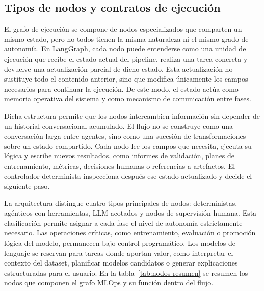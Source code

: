 \documentclass[12pt,a4paper]{article}
\theoremstyle{plain}
\begin{document}
\subsection{Tipos de nodos y contratos de ejecución}
\label{sec:tipos-nodos}

El grafo de ejecución se compone de nodos especializados que comparten un mismo estado, pero no todos tienen la misma naturaleza ni el mismo grado de autonomía. En LangGraph, cada nodo puede entenderse como una unidad de ejecución que recibe el estado actual del pipeline, realiza una tarea concreta y devuelve una actualización parcial de dicho estado. Esta actualización no sustituye todo el contenido anterior, sino que modifica únicamente los campos necesarios para continuar la ejecución. De este modo, el estado actúa como memoria operativa del sistema y como mecanismo de comunicación entre fases.

Dicha estructura permite que los nodos intercambien información sin depender de un historial conversacional acumulado. El flujo no se construye como una conversación larga entre agentes, sino como una sucesión de transformaciones sobre un estado compartido. Cada nodo lee los campos que necesita, ejecuta su lógica y escribe nuevos resultados, como informes de validación, planes de entrenamiento, métricas, decisiones humanas o referencias a artefactos. El controlador determinista inspecciona después ese estado actualizado y decide el siguiente paso.

La arquitectura distingue cuatro tipos principales de nodos: deterministas, agénticos con herramientas, LLM acotados y nodos de supervisión humana. Esta clasificación permite asignar a cada fase el nivel de autonomía estrictamente necesario. Las operaciones críticas, como entrenamiento, evaluación o promoción lógica del modelo, permanecen bajo control programático. Los modelos de lenguaje se reservan para tareas donde aportan valor, como interpretar el contexto del dataset, planificar modelos candidatos o generar explicaciones estructuradas para el usuario. En la tabla~\ref{tab:nodos-resumen} se resumen los nodos que componen el grafo MLOps y su función dentro del flujo. %
\end{document}
